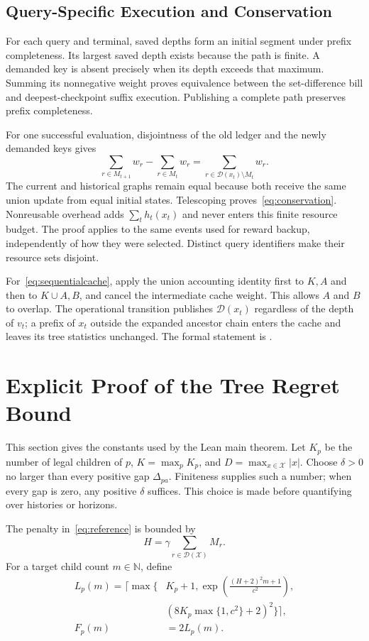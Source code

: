 \subsection{Query-Specific Execution and Conservation}
For each query and terminal, saved depths form an initial segment under prefix completeness. Its largest saved depth exists because the path is finite. A demanded key is absent precisely when its depth exceeds that maximum. Summing its nonnegative weight proves equivalence between the set-difference bill and deepest-checkpoint suffix execution. Publishing a complete path preserves prefix completeness.

For one successful evaluation, disjointness of the old ledger and the newly demanded keys gives
\[
 \sum_{r\in M_{t+1}}w_r-\sum_{r\in M_t}w_r
       =\sum_{r\in\mathcal D(x_t)\setminus M_t}w_r.
\]
The current and historical graphs remain equal because both receive the same union update from equal initial states. Telescoping proves~\eqref{eq:conservation}. Nonreusable overhead adds $\sum_t h_t(x_t)$ and never enters this finite resource budget. The proof applies to the same events used for reward backup, independently of how they were selected. Distinct query identifiers make their resource sets disjoint.

For~\eqref{eq:sequentialcache}, apply the union accounting identity first to $K,A$ and then to $K\cup A,B$, and cancel the intermediate cache weight. This allows $A$ and $B$ to overlap. The operational transition publishes $\mathcal D(x_t)$ regardless of the depth of $v_t$; a prefix of $x_t$ outside the expanded ancestor chain enters the cache and leaves its tree statistics unchanged. The formal statement is .

\section{Explicit Proof of the Tree Regret Bound}
\label{app:rate}
This section gives the constants used by the Lean main theorem. Let $K_p$ be the number of legal children of $p$, $K=\max_p K_p$, and $D=\max_{x\in\mathcal X}|x|$. Choose $\delta>0$ no larger than every positive gap $\Delta_{pa}$. Finiteness supplies such a number; when every gap is zero, any positive $\delta$ suffices. This choice is made before quantifying over histories or horizons.

The penalty in~\eqref{eq:reference} is bounded by
\[
 H=\gamma\sum_{r\in\mathcal D(\mathcal X)}M_r.
\]
For a target child count $m\in\mathbb N$, define
\begin{align}
 L_p(m)=\Biggl\lceil\max\Biggl\{&K_p+1,
 \exp\!\left(\frac{(H+2)^2m+1}{c^2}\right),\nonumber\\
 &(8K_p\max\{1,c^2\}+2)^2\Biggr\}\Biggr\rceil,
 \label{eq:window}\\
 F_p(m)&=2L_p(m).\nonumber
\end{align}


